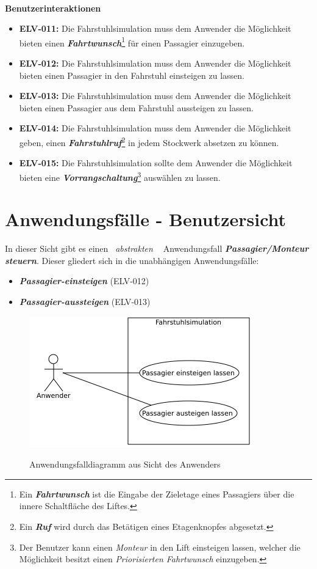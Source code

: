 \paragraph{}
\textbf{Benutzerinteraktionen}
\begin{itemize}
	\item \textbf{ELV-011:}
		Die Fahrstuhlsimulation muss dem Anwender die Möglichkeit bieten einen \textbf{\textit{Fahrtwunsch}}\footnote{Ein 						\textbf{\textit{Fahrtwunsch}} ist die Eingabe der Zieletage eines Passagiers über die innere Schaltfläche des Liftes.} für einen Passagier 		einzugeben.
	\item \textbf{ELV-012:}
		Die Fahrstuhlsimulation muss dem Anwender die Möglichkeit bieten einen Passagier in den Fahrstuhl einsteigen zu lassen.
	\item \textbf{ELV-013:}
		Die Fahrstuhlsimulation muss dem Anwender die Möglichkeit bieten einen Passagier aus dem Fahrstuhl aussteigen zu lassen.
	\item \textbf{ELV-014:}
		Die Fahrstuhlsimulation muss dem Anwender die Möglichkeit geben, einen \textbf{\textit{Fahrstuhlruf}}\footnote{Ein \textbf{\textit{Ruf}} 		wird durch das Betätigen eines Etagenknopfes abgesetzt.} in jedem Stockwerk absetzen zu können.
	\item \textbf{ELV-015:}
		Die Fahrstuhlsimulation sollte dem Anwender die Möglichkeit bieten eine \textbf{\textit{Vorrangschaltung}}\footnote{Der Benutzer kann einen 		\textit{Monteur} in den Lift einsteigen lassen, welcher die Möglichkeit besitzt einen \textit{Priorisierten Fahrtwunsch} einzugeben.} 			auswählen zu lassen.
\end{itemize}

\newpage
\section{Anwendungsfälle - Benutzersicht}
In dieser Sicht gibt es einen \textit{\guillemotleft \ abstrakten \ \guillemotright} Anwendungsfall \textit{\textbf{Passagier/Monteur steuern}}. Dieser gliedert sich in die unabhängigen Anwendungsfälle:

\begin{itemize}
	\item \textit{\textbf{Passagier-einsteigen}} (ELV-012)
	\item \textit{\textbf{Passagier-aussteigen}} (ELV-013)
\end{itemize}

\begin{figure}[hbt]
	\includegraphics{images/anwenderAWF.png}
	\label{fig:anwenderAWF}
	\caption{Anwendungsfalldiagramm aus Sicht des Anwenders}
\end{figure}

